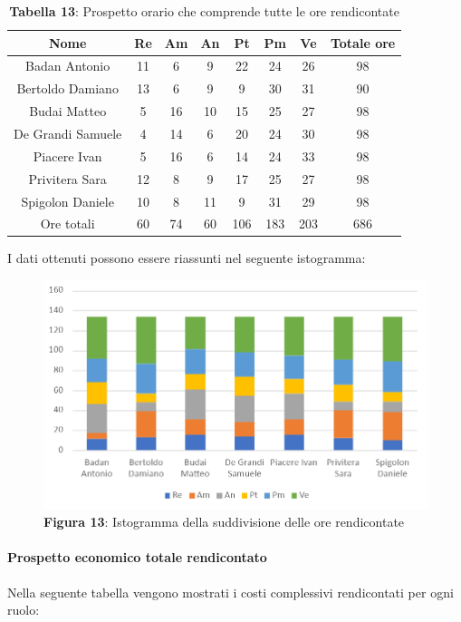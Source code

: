 \begin{table}[H]
	\centering
	\renewcommand{\arraystretch}{1.5}
	\begin{tabular}{|c|c|c|c|c|c|c|c|}
		\hline
		\rowcolor{lighter-grayer}
		Nome & Re & Am & An & Pt & Pm & Ve & Totale ore\\
		\hline
		Badan Antonio & 11 & 6 & 9 & 22 & 24 & 26 & 98 \\
		\hline
		Bertoldo Damiano & 13 & 6 & 9 & 9 & 30 & 31 & 90 \\
		\hline
		Budai Matteo & 5 & 16 & 10 & 15 & 25 & 27 & 98 \\
		\hline
		De Grandi Samuele & 4 & 14 & 6 & 20 & 24 & 30 & 98 \\
		\hline
		Piacere Ivan & 5 & 16 & 6 & 14 & 24 & 33 & 98 \\
		\hline
		Privitera Sara & 12 & 8 & 9 & 17 & 25 & 27 & 98 \\
		\hline
		Spigolon Daniele & 10 & 8 & 11 & 9 & 31 & 29 & 98 \\
		\hline
		Ore totali & 60 & 74 & 60 & 106 & 183 & 203 & 686 \\
		\hline
	\end{tabular}
	\caption*{\textbf{Tabella 13}: Prospetto orario che comprende tutte le ore rendicontate\\}
\end{table}	
I dati ottenuti possono essere riassunti nel seguente istogramma:

\begin{figure}[H]
	\centering
	\includegraphics[width=0.7\linewidth]{res/images/IstogrammaTotaleRendicontato.png}
	\caption*{\textbf{Figura 13}: Istogramma della suddivisione delle ore rendicontate}
	\label{fig:Figura10}
\end{figure}

\paragraph{Prospetto economico totale rendicontato}
Nella seguente tabella vengono mostrati i costi complessivi rendicontati per ogni ruolo:

